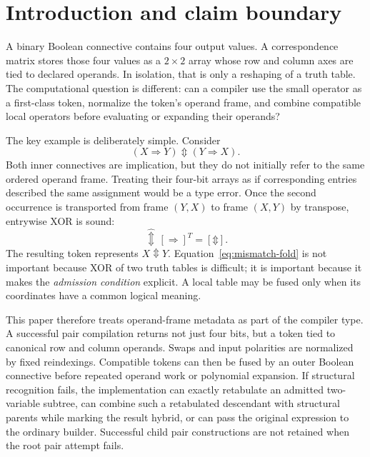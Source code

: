 \documentclass[10pt]{article}
\newcommand{\bxor}{\mathbin{\Updownarrow}}
\newcommand{\ptop}[1]{\widehat{#1}}
\theoremstyle{plain}
\theoremstyle{definition}
\theoremstyle{remark}
\begin{document}
\section{Introduction and claim boundary}

A binary Boolean connective contains four output values. A correspondence matrix stores those four values as a $2\times2$ array whose row and column axes are tied to declared operands. In isolation, that is only a reshaping of a truth table. The computational question is different: can a compiler use the small operator as a first-class token, normalize the token's operand frame, and combine compatible local operators before evaluating or expanding their operands?

The key example is deliberately simple. Consider
\begin{equation}
 (X\Rightarrow Y)\bxor(Y\Rightarrow X).
 \label{eq:mismatch-expression}
\end{equation}
Both inner connectives are implication, but they do not initially refer to the same ordered operand frame. Treating their four-bit arrays as if corresponding entries described the same assignment would be a type error. Once the second occurrence is transported from frame $(Y,X)$ to frame $(X,Y)$ by transpose, entrywise XOR is sound:
\begin{equation}
 [\Rightarrow]\,\ptop{\bxor}\,[\Rightarrow]^T=[\bxor].
 \label{eq:mismatch-fold}
\end{equation}
The resulting token represents $X\bxor Y$. Equation~\eqref{eq:mismatch-fold} is not important because XOR of two truth tables is difficult; it is important because it makes the \emph{admission condition} explicit. A local table may be fused only when its coordinates have a common logical meaning.

This paper therefore treats operand-frame metadata as part of the compiler type. A successful pair compilation returns not just four bits, but a token tied to canonical row and column operands. Swaps and input polarities are normalized by fixed reindexings. Compatible tokens can then be fused by an outer Boolean connective before repeated operand work or polynomial expansion. If structural recognition fails, the implementation can exactly retabulate an admitted two-variable subtree, can combine such a retabulated descendant with structural parents while marking the result hybrid, or can pass the original expression to the ordinary builder. Successful child pair constructions are not retained when the root pair attempt fails.
\end{document}
